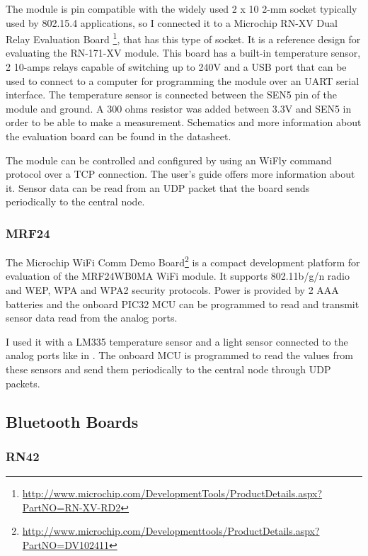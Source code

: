 The module is pin compatible with the widely used 2 x 10 2-mm socket typically used by 802.15.4 applications, so I connected it to a Microchip RN-XV Dual Relay Evaluation Board \footnote{\url{http://www.microchip.com/DevelopmentTools/ProductDetails.aspx?PartNO=RN-XV-RD2}}, that has this type of socket. It is a reference design for evaluating the RN-171-XV module. This board has a built-in temperature sensor, 2 10-amps relays capable of switching up to 240V and a USB port that can be used to connect to a computer for programming the module over an UART serial interface. The temperature sensor is connected between the SEN5 pin of the module and ground. A 300 ohms resistor was added between 3.3V and SEN5 in order to be able to make a measurement. Schematics and more information about the evaluation board can be found in the datasheet\cite{ev-board-datasheet}.

The module can be controlled and configured by using an WiFly command protocol over a TCP connection. The user's guide\cite{wiFly-ref} offers more information about it. Sensor data can be read from an UDP packet that the board sends periodically to the central node.

\subsubsection{MRF24}

The Microchip WiFi Comm Demo Board\footnote{\url{http://www.microchip.com/Developmenttools/ProductDetails.aspx?PartNO=DV102411}} is a compact development platform for evaluation of the MRF24WB0MA WiFi module. It supports 802.11b/g/n radio and WEP, WPA and WPA2 security protocols. Power is provided by 2 AAA batteries and the onboard PIC32 MCU can be programmed to read and transmit sensor data read from the analog ports.

I used it with a LM335 temperature sensor and a light sensor connected to the analog ports like in . The onboard MCU is programmed to read the values from these sensors and send them periodically to the central node through UDP packets.

\subsection{Bluetooth Boards}

\subsubsection{RN42}

